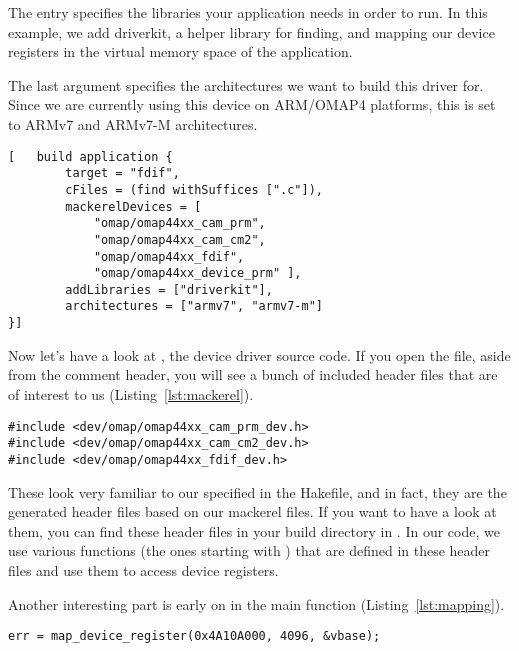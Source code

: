 \documentclass[a4paper,11pt,twoside]{report}
\begin{document}
The  entry specifies the libraries your application
needs in order to run. In this example, we add driverkit, a helper library for
finding, and mapping our device registers in the virtual memory space of the
application.

The last argument specifies the architectures we want to build this driver
for. Since we are currently using this device on ARM/OMAP4 platforms, this is
set to ARMv7 and ARMv7-M architectures.

\begin{lstlisting}[caption={A Hakefile for a simple device driver}, label={lst:hakefile}]
[   build application {
        target = "fdif",
        cFiles = (find withSuffices [".c"]),
        mackerelDevices = [
            "omap/omap44xx_cam_prm",
            "omap/omap44xx_cam_cm2",
            "omap/omap44xx_fdif",
            "omap/omap44xx_device_prm" ],
        addLibraries = ["driverkit"],
        architectures = ["armv7", "armv7-m"]
}]
\end{lstlisting}

Now let's have a look at , the
device driver source code. If you open the file, aside from the comment
header, you will see a bunch of included header files that are of interest to
us (Listing~\ref{lst:mackerel}).

\begin{lstlisting}[caption={Mackerel includes in driver source code.}, label={lst:mackerel}]
#include <dev/omap/omap44xx_cam_prm_dev.h>
#include <dev/omap/omap44xx_cam_cm2_dev.h>
#include <dev/omap/omap44xx_fdif_dev.h>
\end{lstlisting}

These look very familiar to our specified  in the
Hakefile, and in fact, they are the generated header files based on our
mackerel files. If you want to have a look at them, you can find these header
files in your build directory in . In our
code, we use various functions (the ones starting with )
that are defined in these header files and use them to access device
registers.

Another interesting part is early on in the main function (Listing~\ref{lst:mapping}).

\begin{lstlisting}[caption={Mapping device registers in virtual memory.}, label={lst:mapping}]
err = map_device_register(0x4A10A000, 4096, &vbase);
\end{lstlisting}
\end{document}
